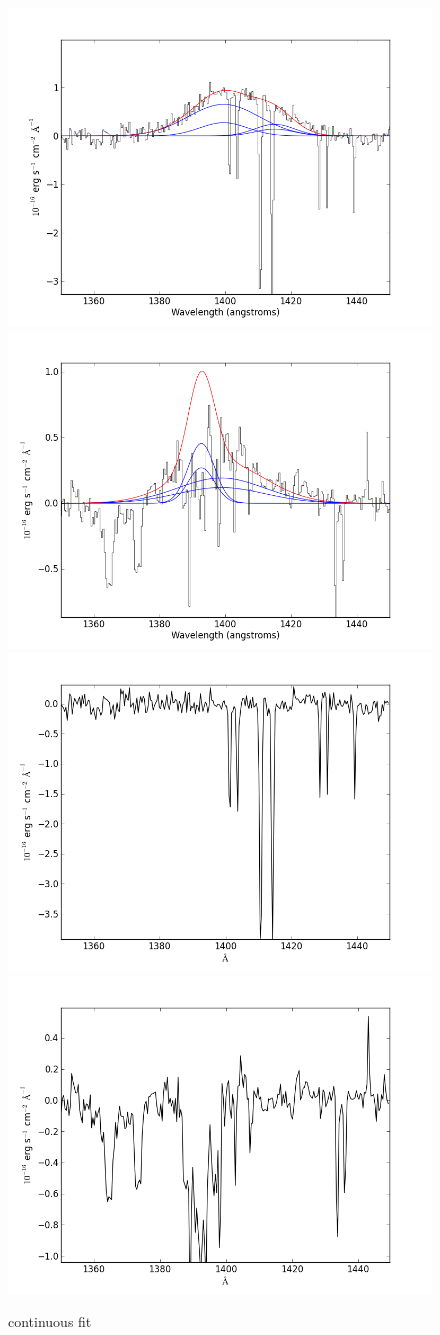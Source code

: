 \documentclass[usenatbib]{mn2e}
\begin{document}
\newpage


\begin{figure}
\begin{center}
\includegraphics[width=0.46\linewidth,angle=0]{SiIV_6.png}
\vspace{5mm}
\includegraphics[width=0.49\linewidth,angle=0]{SiIV_7.png}\\
\includegraphics[width=0.46\linewidth,angle=0]{SiIV_res_6.png}
\hspace{5mm}
\includegraphics[width=0.49\linewidth,angle=0]{SiIV_res_7.png}\\
\end{center} 
\caption{continuous fit \label{fig:landscape}}   
\end{figure}
\end{document}
